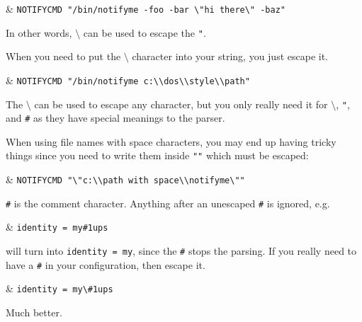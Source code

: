 \documentclass[12pt]{article}
\newcommand{\bsl}{$\setminus$}       %
\begin{document}
\begin{LinePrinter}[0.9\LinePrinterwidth]
\Clunk & \verb`NOTIFYCMD "/bin/notifyme -foo -bar \"hi there\" -baz"` \\
\end{LinePrinter}

In other words, \texttt{\bsl} can be used to escape the \texttt{"}.

When you need to put the \texttt{\bsl} character into your string, you just
escape it.

\begin{LinePrinter}[0.9\LinePrinterwidth]
\Clunk & \verb`NOTIFYCMD "/bin/notifyme c:\\dos\\style\\path"` \\
\end{LinePrinter}

The \texttt{\bsl} can be used to escape any character, but you only
really need it for \texttt{\bsl}, \texttt{"}, and \texttt{\#} as they have
special meanings to the parser.

When using file names with space characters, you may end up having tricky
things since you need to write them inside \texttt{""} which must be escaped:

\begin{LinePrinter}[0.9\LinePrinterwidth]
\Clunk & \verb`NOTIFYCMD "\"c:\\path with space\\notifyme\""` \\
\end{LinePrinter}

\texttt{\#} is the comment character.  Anything after an unescaped \texttt{\#}
is ignored, e.g.

\begin{LinePrinter}[0.9\LinePrinterwidth]
\Clunk & \verb`identity = my#1ups` \\
\end{LinePrinter}

will turn into \texttt{identity = my}, since the \texttt{\#} stops the
parsing. If you really need to have a \texttt{\#} in your configuration, then
escape it.

\begin{LinePrinter}[0.9\LinePrinterwidth]
\Clunk & \verb`identity = my\#1ups` \\
\end{LinePrinter}

Much better.
\end{document}
